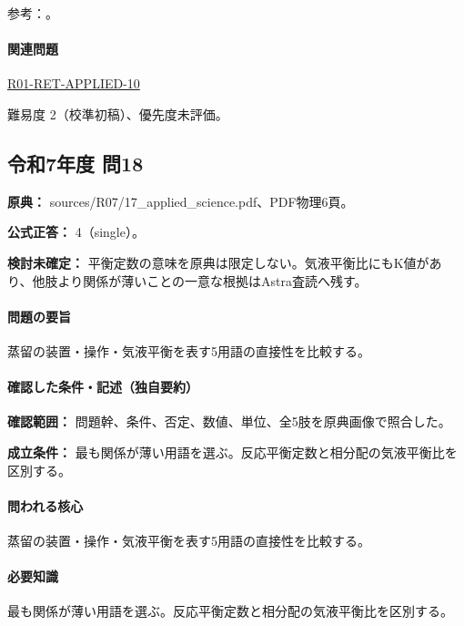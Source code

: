 \par 参考：\cite{nptel_distillation1,nptel_azeotrope}。

\paragraph{関連問題} \hyperref[q:r01-ret-applied-10]{R01-RET-APPLIED-10}

\par 難易度 2（校準初稿）、優先度未評価。

\subsection{令和7年度 問18}
\label{q:r07-reg-applied-18}

\noindent\textbf{原典：} sources/R07/17\_applied\_science.pdf、PDF物理6頁。

\textbf{公式正答：} 4（single）。

\par\textbf{検討未確定：} 平衡定数の意味を原典は限定しない。気液平衡比にもK値があり、他肢より関係が薄いことの一意な根拠はAstra査読へ残す。

\paragraph{問題の要旨} 蒸留の装置・操作・気液平衡を表す5用語の直接性を比較する。

\paragraph{確認した条件・記述（独自要約）}\mbox{}\par

\noindent\textbf{確認範囲：} 問題幹、条件、否定、数値、単位、全5肢を原典画像で照合した。\par

\noindent\textbf{成立条件：} 最も関係が薄い用語を選ぶ。反応平衡定数と相分配の気液平衡比を区別する。\par

\paragraph{問われる核心} 蒸留の装置・操作・気液平衡を表す5用語の直接性を比較する。

\paragraph{必要知識} 最も関係が薄い用語を選ぶ。反応平衡定数と相分配の気液平衡比を区別する。

